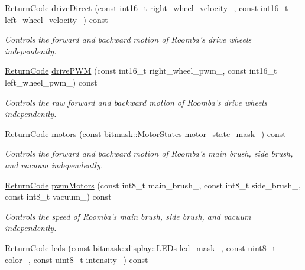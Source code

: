 \begin{DoxyCompactItemize}
\hyperlink{classroomba_1_1series500_1_1_open_interface_a43fc2ae1216e57cfb46901331b9ab4c7}{Return\+Code} \hyperlink{classroomba_1_1series500_1_1_open_interface_a3148367bdbf04abcb590c48adc03d2a1}{drive\+Direct} (const int16\+\_\+t right\+\_\+wheel\+\_\+velocity\+\_\+, const int16\+\_\+t left\+\_\+wheel\+\_\+velocity\+\_\+) const 
\begin{DoxyCompactList}\small\item\em Controls the forward and backward motion of Roomba’s drive wheels independently. \end{DoxyCompactList}\item 
\hyperlink{classroomba_1_1series500_1_1_open_interface_a43fc2ae1216e57cfb46901331b9ab4c7}{Return\+Code} \hyperlink{classroomba_1_1series500_1_1_open_interface_aec2dbec11bbd03d2b07403692d43a658}{drive\+P\+W\+M} (const int16\+\_\+t right\+\_\+wheel\+\_\+pwm\+\_\+, const int16\+\_\+t left\+\_\+wheel\+\_\+pwm\+\_\+) const 
\begin{DoxyCompactList}\small\item\em Controls the raw forward and backward motion of Roomba’s drive wheels independently. \end{DoxyCompactList}\item 
\hyperlink{classroomba_1_1series500_1_1_open_interface_a43fc2ae1216e57cfb46901331b9ab4c7}{Return\+Code} \hyperlink{classroomba_1_1series500_1_1_open_interface_a350b0236512caa59c8b887ad58e0ad95}{motors} (const bitmask\+::\+Motor\+States motor\+\_\+state\+\_\+mask\+\_\+) const 
\begin{DoxyCompactList}\small\item\em Controls the forward and backward motion of Roomba’s main brush, side brush, and vacuum independently. \end{DoxyCompactList}\item 
\hyperlink{classroomba_1_1series500_1_1_open_interface_a43fc2ae1216e57cfb46901331b9ab4c7}{Return\+Code} \hyperlink{classroomba_1_1series500_1_1_open_interface_ad5bfebf55b685a6c793bb948618bd265}{pwm\+Motors} (const int8\+\_\+t main\+\_\+brush\+\_\+, const int8\+\_\+t side\+\_\+brush\+\_\+, const int8\+\_\+t vacuum\+\_\+) const 
\begin{DoxyCompactList}\small\item\em Controls the speed of Roomba’s main brush, side brush, and vacuum independently. \end{DoxyCompactList}\item 
\hyperlink{classroomba_1_1series500_1_1_open_interface_a43fc2ae1216e57cfb46901331b9ab4c7}{Return\+Code} \hyperlink{classroomba_1_1series500_1_1_open_interface_a02b07148f3745190241059eca07bcad9}{leds} (const bitmask\+::display\+::\+L\+E\+Ds led\+\_\+mask\+\_\+, const uint8\+\_\+t color\+\_\+, const uint8\+\_\+t intensity\+\_\+) const 

\end{DoxyCompactItemize}
